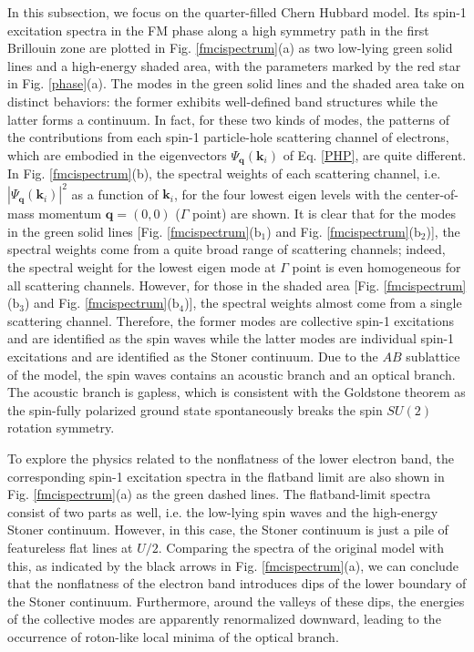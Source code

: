 \documentclass[amsmath,superscriptaddress,showpacs,aps,prb,twocolumn]{revtex4-1}
\begin{document}
\par In this subsection, we focus on the quarter-filled Chern Hubbard model. Its spin-1 excitation spectra in the FM phase along a high symmetry path in the first Brillouin zone are plotted in Fig. \ref{fmcispectrum}(a) as two low-lying green solid lines and a high-energy shaded area, with the parameters marked by the red star in Fig. \ref{phase}(a). The modes in the green solid lines and the shaded area take on distinct behaviors: the former exhibits well-defined band structures while the latter forms a continuum. In fact, for these two kinds of modes, the patterns of the contributions from each spin-1 particle-hole scattering channel of electrons, which are embodied in the eigenvectors $\Psi_{\mathbf{q}}(\mathbf{k}_i)$ of Eq. \ref{PHP}, are quite different. In Fig. \ref{fmcispectrum}(b), the spectral weights of each scattering channel, i.e. $|\Psi_{\mathbf{q}}(\mathbf{k}_i)|^2$ as a function of $\mathbf{k}_i$, for the four lowest eigen levels with the center-of-mass momentum $\mathbf{q}=(0,0)$ ($\Gamma$ point) are shown. It is clear that for the modes in the green solid lines [Fig. \ref{fmcispectrum}($\text{b}_1$) and Fig. \ref{fmcispectrum}($\text{b}_2$)], the spectral weights come from a quite broad range of scattering channels; indeed, the spectral weight for the lowest eigen mode at $\Gamma$ point is even homogeneous for all scattering channels. However, for those in the shaded area [Fig. \ref{fmcispectrum}($\text{b}_3$) and Fig. \ref{fmcispectrum}($\text{b}_4$)], the spectral weights almost come from a single scattering channel. Therefore, the former modes are collective spin-1 excitations and are identified as the spin waves while the latter modes are individual spin-1 excitations and are identified as the Stoner continuum. Due to the $AB$ sublattice of the model, the spin waves contains an acoustic branch and an optical branch. The acoustic branch is gapless, which is consistent with the Goldstone theorem as the spin-fully polarized ground state spontaneously breaks the spin $SU(2)$ rotation symmetry.

\par To explore the physics related to the nonflatness of the lower electron band, the corresponding spin-1 excitation spectra in the flatband limit are also shown in Fig. \ref{fmcispectrum}(a) as the green dashed lines. The flatband-limit spectra consist of two parts as well, i.e. the low-lying spin waves and the high-energy Stoner continuum. However, in this case, the Stoner continuum is just a pile of featureless flat lines at $U/2$. Comparing the spectra of the original model with this, as indicated by the black arrows in Fig. \ref{fmcispectrum}(a), we can conclude that the nonflatness of the electron band introduces dips of the lower boundary of the Stoner continuum. Furthermore, around the valleys of these dips, the energies of the collective modes are apparently renormalized downward, leading to the occurrence of roton-like local minima of the optical branch.
\end{document}
